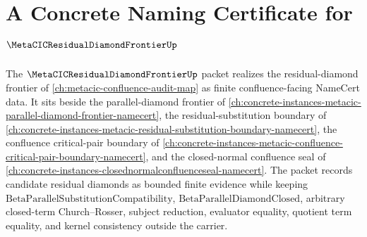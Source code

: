 \chapter{A Concrete Naming Certificate for $\MetaCICResidualDiamondFrontierUp$}
\label{ch:concrete-instances-metacic-residual-diamond-frontier-namecert}

The $\MetaCICResidualDiamondFrontierUp$ packet realizes the residual-diamond frontier of \autoref{ch:metacic-confluence-audit-map} as finite confluence-facing NameCert data. It sits beside the parallel-diamond frontier of \autoref{ch:concrete-instances-metacic-parallel-diamond-frontier-namecert}, the residual-substitution boundary of \autoref{ch:concrete-instances-metacic-residual-substitution-boundary-namecert}, the confluence critical-pair boundary of \autoref{ch:concrete-instances-metacic-confluence-critical-pair-boundary-namecert}, and the closed-normal confluence seal of \autoref{ch:concrete-instances-closednormalconfluenceseal-namecert}. The packet records candidate residual diamonds as bounded finite evidence while keeping $\mathrm{BetaParallelSubstitutionCompatibility}$, $\mathrm{BetaParallelDiamondClosed}$, arbitrary closed-term Church--Rosser, subject reduction, evaluator equality, quotient term equality, and kernel consistency outside the carrier.



